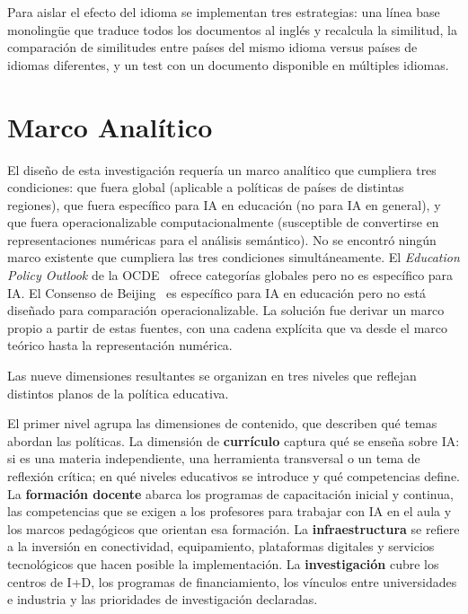 Para aislar el efecto del idioma se implementan tres estrategias: una línea base monolingüe que traduce todos los documentos al inglés y recalcula la similitud, la comparación de similitudes entre países del mismo idioma versus países de idiomas diferentes, y un test con un documento disponible en múltiples idiomas.

\section{Marco Analítico}

El diseño de esta investigación requería un marco analítico que cumpliera tres condiciones: que fuera global (aplicable a políticas de países de distintas regiones), que fuera específico para IA en educación (no para IA en general), y que fuera operacionalizable computacionalmente (susceptible de convertirse en representaciones numéricas para el análisis semántico). No se encontró ningún marco existente que cumpliera las tres condiciones simultáneamente. El \textit{Education Policy Outlook} de la OCDE~\citep{oecd2021epo} ofrece categorías globales pero no es específico para IA. El Consenso de Beijing~\citep{unesco2019beijing} es específico para IA en educación pero no está diseñado para comparación operacionalizable. La solución fue derivar un marco propio a partir de estas fuentes, con una cadena explícita que va desde el marco teórico hasta la representación numérica.

Las nueve dimensiones resultantes se organizan en tres niveles que reflejan distintos planos de la política educativa.

El primer nivel agrupa las dimensiones de contenido, que describen qué temas abordan las políticas. La dimensión de \textbf{currículo} captura qué se enseña sobre IA: si es una materia independiente, una herramienta transversal o un tema de reflexión crítica; en qué niveles educativos se introduce y qué competencias define. La \textbf{formación docente} abarca los programas de capacitación inicial y continua, las competencias que se exigen a los profesores para trabajar con IA en el aula y los marcos pedagógicos que orientan esa formación. La \textbf{infraestructura} se refiere a la inversión en conectividad, equipamiento, plataformas digitales y servicios tecnológicos que hacen posible la implementación. La \textbf{investigación} cubre los centros de I+D, los programas de financiamiento, los vínculos entre universidades e industria y las prioridades de investigación declaradas.

